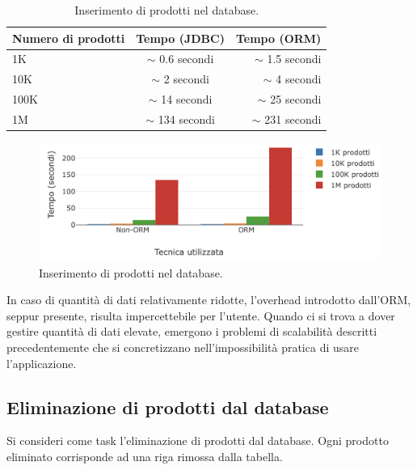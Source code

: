\begin{table}[h!]
  \begin{center}
    \caption{Inserimento di prodotti nel database.}
    \begin{tabular}{l|c|r} %
      \textbf{Numero di prodotti} & \textbf{Tempo (JDBC)} & \textbf{Tempo (ORM)}\\
      \hline
      1K & $\sim$ 0.6 secondi & $\sim$ 1.5 secondi\\
      10K & $\sim$ 2 secondi & $\sim$ 4 secondi\\
      100K & $\sim$ 14 secondi & $\sim$ 25 secondi\\
      1M & $\sim$ 134 secondi & $\sim$ 231 secondi\\
    \end{tabular}
  \end{center}
\end{table}

\begin{figure}[H]
  \includegraphics[width=\linewidth]{images/insert-products.png}
  \caption{Inserimento di prodotti nel database.}
  \label{fig:insertproducts}
\end{figure}

In caso di quantità di dati relativamente ridotte, l'overhead introdotto dall'ORM, seppur presente, risulta impercettebile per l'utente. Quando ci si trova a dover gestire quantità di dati elevate, emergono i problemi di scalabilità descritti precedentemente che si concretizzano nell'impossibilità pratica di usare l'applicazione.

\newpage

\subsection{Eliminazione di prodotti dal database}

Si consideri come task l'eliminazione di prodotti dal database. Ogni prodotto eliminato corrisponde ad una riga rimossa dalla tabella.


